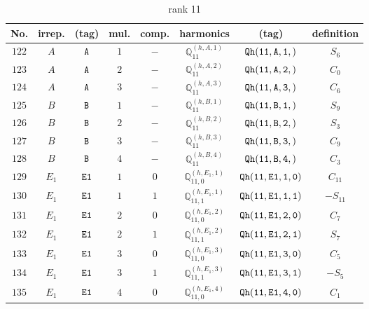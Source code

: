 \documentclass[fleqn,8pt]{jsarticle}
\begin{document}
\begin{table}[ht!]
\begin{center}
\caption{rank 11}
\renewcommand{\arraystretch}{1.3}
\begin{tabular}{cccccccc} \hline \hline
No. & irrep. & (tag) & mul. & comp. & harmonics & (tag) & definition \\ \hline
$ 122 $ & $ A $ & $ {\tt A} $ & $ 1 $ & $ - $ & $ \mathbb{Q}_{11}^{(h,A,1)} $ & $ {\tt Qh(11,A,1,)} $ & $ S_{6} $ \\
$ 123 $ & $ A $ & $ {\tt A} $ & $ 2 $ & $ - $ & $ \mathbb{Q}_{11}^{(h,A,2)} $ & $ {\tt Qh(11,A,2,)} $ & $ C_{0} $ \\
$ 124 $ & $ A $ & $ {\tt A} $ & $ 3 $ & $ - $ & $ \mathbb{Q}_{11}^{(h,A,3)} $ & $ {\tt Qh(11,A,3,)} $ & $ C_{6} $ \\
$ 125 $ & $ B $ & $ {\tt B} $ & $ 1 $ & $ - $ & $ \mathbb{Q}_{11}^{(h,B,1)} $ & $ {\tt Qh(11,B,1,)} $ & $ S_{9} $ \\
$ 126 $ & $ B $ & $ {\tt B} $ & $ 2 $ & $ - $ & $ \mathbb{Q}_{11}^{(h,B,2)} $ & $ {\tt Qh(11,B,2,)} $ & $ S_{3} $ \\
$ 127 $ & $ B $ & $ {\tt B} $ & $ 3 $ & $ - $ & $ \mathbb{Q}_{11}^{(h,B,3)} $ & $ {\tt Qh(11,B,3,)} $ & $ C_{9} $ \\
$ 128 $ & $ B $ & $ {\tt B} $ & $ 4 $ & $ - $ & $ \mathbb{Q}_{11}^{(h,B,4)} $ & $ {\tt Qh(11,B,4,)} $ & $ C_{3} $ \\
$ 129 $ & $ E_{1} $ & $ {\tt E1} $ & $ 1 $ & $ 0 $ & $ \mathbb{Q}_{11,0}^{(h,E_{1},1)} $ & $ {\tt Qh(11,E1,1,0)} $ & $ C_{11} $ \\
$ 130 $ & $ E_{1} $ & $ {\tt E1} $ & $ 1 $ & $ 1 $ & $ \mathbb{Q}_{11,1}^{(h,E_{1},1)} $ & $ {\tt Qh(11,E1,1,1)} $ & $ - S_{11} $ \\
$ 131 $ & $ E_{1} $ & $ {\tt E1} $ & $ 2 $ & $ 0 $ & $ \mathbb{Q}_{11,0}^{(h,E_{1},2)} $ & $ {\tt Qh(11,E1,2,0)} $ & $ C_{7} $ \\
$ 132 $ & $ E_{1} $ & $ {\tt E1} $ & $ 2 $ & $ 1 $ & $ \mathbb{Q}_{11,1}^{(h,E_{1},2)} $ & $ {\tt Qh(11,E1,2,1)} $ & $ S_{7} $ \\
$ 133 $ & $ E_{1} $ & $ {\tt E1} $ & $ 3 $ & $ 0 $ & $ \mathbb{Q}_{11,0}^{(h,E_{1},3)} $ & $ {\tt Qh(11,E1,3,0)} $ & $ C_{5} $ \\
$ 134 $ & $ E_{1} $ & $ {\tt E1} $ & $ 3 $ & $ 1 $ & $ \mathbb{Q}_{11,1}^{(h,E_{1},3)} $ & $ {\tt Qh(11,E1,3,1)} $ & $ - S_{5} $ \\
$ 135 $ & $ E_{1} $ & $ {\tt E1} $ & $ 4 $ & $ 0 $ & $ \mathbb{Q}_{11,0}^{(h,E_{1},4)} $ & $ {\tt Qh(11,E1,4,0)} $ & $ C_{1} $ \\

\end{tabular}
\end{center}
\end{table}
\end{document}

